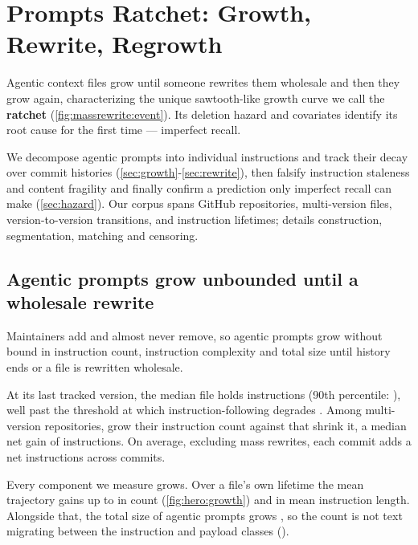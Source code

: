 \section{Prompts Ratchet: Growth, Rewrite, Regrowth}
\label{sec:field}

Agentic context files grow until someone rewrites them wholesale and then they grow again, characterizing the
unique sawtooth-like growth curve we call the \textbf{ratchet} (\autoref{fig:massrewrite:event}). Its
deletion hazard and covariates identify its root cause for the first time --- imperfect recall.

We decompose agentic prompts into individual instructions and track their decay over commit histories
(\autoref{sec:growth}-\ref{sec:rewrite}), then falsify instruction staleness and content fragility and
finally confirm a prediction only imperfect recall can make (\autoref{sec:hazard}). Our corpus spans \FieldRepos{}
GitHub repositories, \FieldMultiVersionFiles{} multi-version files, \FieldMatches{} version-to-version
transitions, and \FieldSpells{} instruction lifetimes;  details construction,
segmentation, matching and censoring.

\subsection{Agentic prompts grow unbounded until a wholesale rewrite}
\label{sec:growth}

Maintainers add and almost never remove, so agentic prompts grow without bound in instruction count,
instruction complexity and total size until history ends or a file is rewritten wholesale.

At its last tracked version, the median file holds \FieldOpMedian{} instructions (90th percentile:
\FieldOpNinety{}), well
past the threshold at which instruction-following degrades
\citep{jiang2024followbench, lior2025wildifeval}. Among \FieldMultiVersionRepos{} multi-version repositories,
\FieldFracGrow{} grow their instruction count against \FieldFracShrink{} that shrink it, a median net gain of
\FieldMedianNetD{} instructions. On average, excluding mass rewrites, each commit adds a net
\FieldNetPerCommit{} instructions across \FieldTouchingCommits{} commits.

Every component we measure grows. Over a file's own lifetime the mean trajectory gains up to
\FieldGrowthCountPeakPct{} in count (\autoref{fig:hero:growth}) and \FieldGrowthLenPeakPct{} in mean
instruction length. Alongside that, the total size of agentic prompts grows \FieldGrowthPayloadPct{},
so the count is not text migrating between the instruction and payload classes
().

